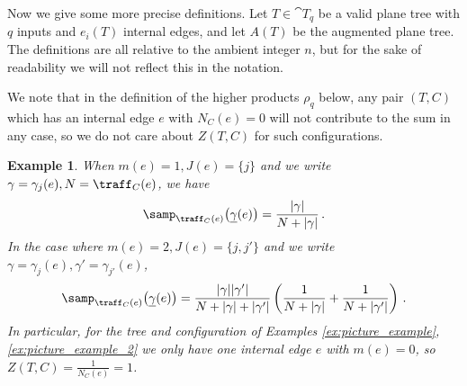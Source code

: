 \documentclass[english,letter paper,12pt,leqno]{article}
\theoremstyle{example}
\newtheorem{example}[theorem]{Example}
\numberwithin{equation}{section}
\begin{document}
Now we give some more precise definitions. Let $T \in \cat{T}_q$ be a valid plane tree with $q$ inputs and $e_i(T)$ internal edges, and let $A(T)$ be the augmented plane tree. The definitions are all relative to the ambient integer $n$, but for the sake of readability we will not reflect this in the notation.

We note that in the definition of the higher products $\rho_q$ below, any pair $(T,C)$ which has an internal edge $e$ with $N_C(e) = 0$ will not contribute to the sum in any case, so we do not care about $Z(T,C)$ for such configurations.

\begin{example} When $m(e) = 1, J(e) = \{ j \}$ and we write $\gamma = \gamma_j(e), N = \traff_C(e)$, we have
\[
\samp_{\traff_C(e)}\big( \underline{\gamma}(e) \big) = \frac{|\gamma|}{N + |\gamma|}\,.
\]
In the case where $m(e) = 2, J(e) = \{ j, j' \}$ and we write $\gamma = \gamma_j(e), \gamma' = \gamma_{j'}(e)$,
\[
\samp_{\traff_C(e)}\big( \underline{\gamma}(e) \big) = \frac{|\gamma||\gamma'|}{N + |\gamma| + |\gamma'|} \left( \frac{1}{N + |\gamma|}  + \frac{1}{N + |\gamma'|}\right)\,.
\]
In particular, for the tree and configuration of Examples \ref{ex:picture_example}, \ref{ex:picture_example_2} we only have one internal edge $e$ with $m(e) = 0$, so $Z(T,C) = \frac{1}{N_C(e)} = 1$.
\end{example}
\end{document}
